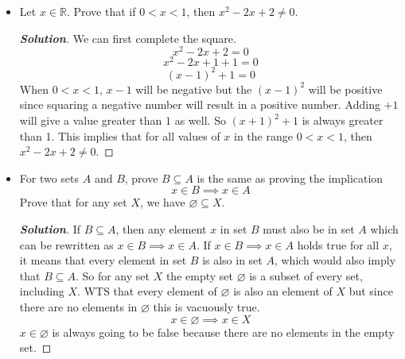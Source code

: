 \documentclass[11pt]{article}
\newenvironment{problem}[2][Problem\!]{\begin{trivlist}
\item[\hskip \labelsep {\bfseries #1}\hskip \labelsep {\bfseries #2.}]}{\end{trivlist}}
\newenvironment{solution}{\begin{proof}[\textbf{\textit{Solution}}]}{\end{proof}}
\newcommand{\rr}{\mathbb R}   %
\renewcommand{\emptyset}{\varnothing}
\begin{document}
\newpage %

\begin{problem}{3.2}\hfill
\begin{itemize}[itemsep=3em]
\item[(a)] Let $x \in \rr$. Prove that if $0 < x < 1$, then $x^2 - 2x + 2 \neq 0$.
\begin{solution}
We can first complete the square.
\[x^2-2x+2 = 0\]
\[x^2-2x+1+1 = 0\]
\[(x-1)^2 + 1 = 0\]
When \(0 < x < 1\), \(x - 1\) will be negative but the \((x-1)^2\) will be positive since squaring a negative number will result in a positive number. Adding \(+1\) will give a value greater than \(1\) as well. So \((x+1)^2 + 1\) is always greater than 1. This implies that for all values of \(x\) in the range \(0 < x < 1\), then \(x^2-2x+2 \neq 0\).
\end{solution}

\item[(b)] For two sets $A$ and $B$, prove $B \subseteq A$ is the same as proving the implication 
\[x \in B \implies x \in A\]
Prove that for any set $X$, we have $\emptyset \subseteq X$.
\begin{solution}
If \(B \subseteq A\), then any element \(x\) in set \(B\) must also be in set \(A\) which can be rewritten as \(x \in B \implies x \in A\). If \(x \in B \implies x \in A\) holds true for all \(x\), it means that every element in set \(B\) is also in set \(A\), which would also imply that \(B \subseteq A\). So for any set \(X\) the empty set \(\emptyset\) is a subset of every set, including \(X\). WTS that every element of \(\emptyset\) is also an element of \(X\) but since there are no elements in \(\emptyset\) this is vacuously true.
\[x \in \emptyset \implies x \in X\]
\(x \in \emptyset\) is always going to be false because there are no elements in the empty set.
\end{solution}

\end{itemize}
\end{problem}

\newpage  %
\end{document}

